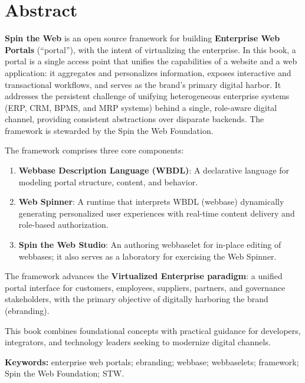 
\chapter*{Abstract}
\textbf{Spin the Web} is an open source framework for building \textbf{Enterprise Web Portals} (``\gls{portal}''), with the intent of virtualizing the enterprise. In this book, a portal is a single access point that unifies the capabilities of a website and a web application: it aggregates and personalizes information, exposes interactive and transactional workflows, and serves as the brand's primary digital harbor. It addresses the persistent challenge of unifying heterogeneous enterprise systems (ERP, CRM, BPMS, and MRP systems) behind a single, role-aware digital channel, providing consistent abstractions over disparate backends. The framework is stewarded by the Spin the Web Foundation.

The framework comprises three core components:
\begin{enumerate}
\item \textbf{Webbase Description Language (WBDL)}: A declarative language for modeling portal structure, content, and behavior.
\item \textbf{Web Spinner}: A runtime that interprets WBDL (webbase) dynamically generating personalized user experiences with real-time content delivery and role-based authorization.
\item \textbf{Spin the Web Studio}: An authoring webbaselet for in-place editing of webbases; it also serves as a laboratory for exercising the Web Spinner.
\end{enumerate}

The framework advances the \textbf{Virtualized Enterprise paradigm}: a unified portal interface for customers, employees, suppliers, partners, and governance stakeholders, with the primary objective of digitally harboring the brand (\gls{ebranding}).

This book combines foundational concepts with practical guidance for developers, integrators, and technology leaders seeking to modernize digital channels.

\textbf{Keywords:} enterprise web portals; ebranding; webbase; webbaselets; framework; Spin the Web Foundation; STW.

\clearpage
